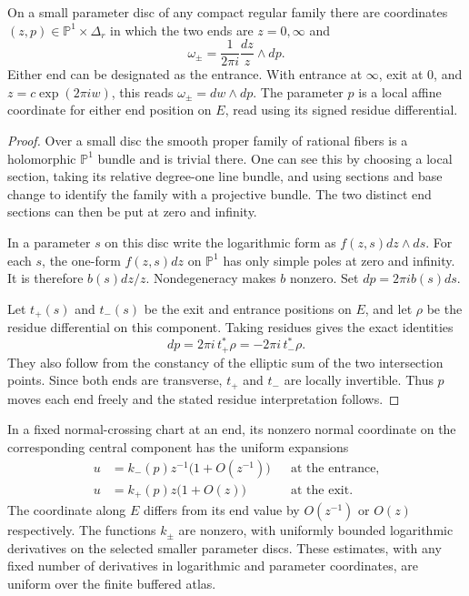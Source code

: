 \begin{lemma}\label{deg:core-coordinates}
On a small parameter disc of any compact regular family there are
coordinates $(z,p)\in\mathbb P^1\times\Delta_r$ in which the two
ends are $z=0,\infty$ and
\[
              \omega_\pm=\frac{1}{2\pi i}\frac{dz}{z}\wedge dp.
\]
Either end can be designated as the entrance.  With entrance at
$\infty$, exit at $0$, and $z=c\exp(2\pi i w)$, this reads
$\omega_\pm=dw\wedge dp$.  The parameter $p$ is a local affine
coordinate for either end position on $E$, read using its signed
residue differential.
\end{lemma}

\begin{proof}
Over a small disc the smooth proper family of rational fibers is
a holomorphic $\mathbb P^1$ bundle and is trivial there.  One can
see this by choosing a local section, taking its relative
degree-one line bundle, and using sections and base change to
identify the family with a projective bundle.  The two distinct
end sections can then be put at zero and infinity.

In a parameter $s$ on this disc write the logarithmic form as
$f(z,s)dz\wedge ds$.  For each $s$, the one-form
$f(z,s)dz$ on $\mathbb P^1$ has only simple poles at zero and
infinity.  It is therefore $b(s)dz/z$.  Nondegeneracy makes $b$
nonzero.  Set $dp=2\pi i b(s)ds$.

Let $t_+(s)$ and $t_-(s)$ be the exit and entrance positions on
$E$, and let $\rho$ be the residue differential on this
component.  Taking residues gives the exact identities
\[
             dp=2\pi i\,t_+^*\rho=-2\pi i\,t_-^*\rho.
\]
They also follow from the constancy of the elliptic sum of the
two intersection points.  Since both ends are transverse,
$t_+$ and $t_-$ are locally invertible.  Thus $p$ moves each
end freely and the stated residue interpretation follows.
\end{proof}

In a fixed normal-crossing chart at an end, its nonzero normal
coordinate on the corresponding central component has the
uniform expansions
\begin{align}
 u&=k_-(p)z^{-1}\bigl(1+O(z^{-1})\bigr)
                                    &&\text{at the entrance},
                                      \label{deg:entrance}\\
 u&=k_+(p)z\bigl(1+O(z)\bigr)
                                    &&\text{at the exit}.
                                      \label{deg:exit}
\end{align}
The coordinate along $E$ differs from its end value by
$O(z^{-1})$ or $O(z)$ respectively.  The functions $k_\pm$
are nonzero, with uniformly bounded logarithmic derivatives on
the selected smaller parameter discs.  These estimates, with
any fixed number of derivatives in logarithmic and parameter
coordinates, are uniform over the finite buffered atlas.

